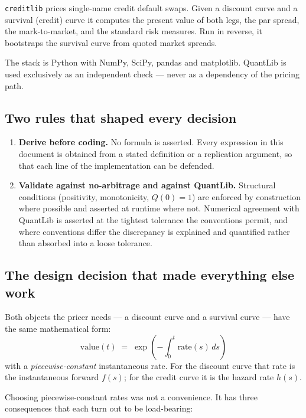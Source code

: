 \documentclass[11pt,a4paper]{article}
\begin{document}
\texttt{creditlib} prices single-name credit default swaps. Given a discount curve and a
survival (credit) curve it computes the present value of both legs, the par spread, the
mark-to-market, and the standard risk measures. Run in reverse, it bootstraps the survival
curve from quoted market spreads.

The stack is Python with NumPy, SciPy, pandas and matplotlib. QuantLib is used
exclusively as an independent check --- never as a dependency of the pricing path.

\subsection{Two rules that shaped every decision}

\begin{enumerate}[leftmargin=1.4em]
\item \textbf{Derive before coding.} No formula is asserted. Every expression in this
document is obtained from a stated definition or a replication argument, so that each line
of the implementation can be defended.
\item \textbf{Validate against no-arbitrage and against QuantLib.} Structural conditions
(positivity, monotonicity, $Q(0)=1$) are enforced by construction where possible and
asserted at runtime where not. Numerical agreement with QuantLib is asserted at the
tightest tolerance the conventions permit, and where conventions differ the discrepancy is
explained and quantified rather than absorbed into a loose tolerance.
\end{enumerate}

\subsection{The design decision that made everything else work}

Both objects the pricer needs --- a discount curve and a survival curve --- have the same
mathematical form:
\[
\text{value}(t) \;=\; \exp\!\left(-\int_0^t \text{rate}(s)\,ds\right)
\]
with a \emph{piecewise-constant} instantaneous rate. For the discount curve that rate is
the instantaneous forward $f(s)$; for the credit curve it is the hazard rate $h(s)$.

Choosing piecewise-constant rates was not a convenience. It has three consequences that
each turn out to be load-bearing:
\end{document}
